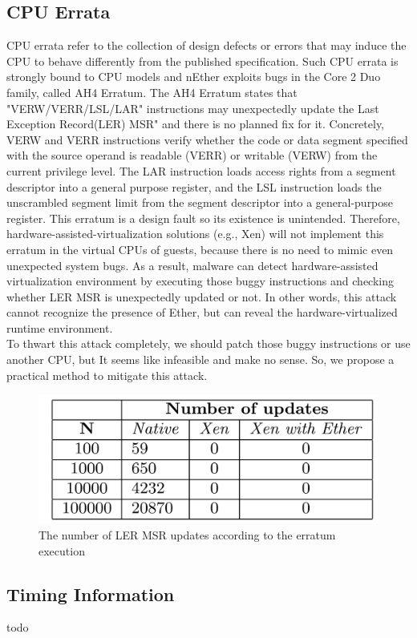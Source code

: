 \subsection{CPU Errata}
\label{sec:approach-errata}
CPU errata refer to the collection of design defects or errors that may induce the CPU to behave differently from the published specification. Such CPU errata is strongly bound to CPU models and nEther exploits bugs in the Core 2 Duo family, called AH4 Erratum. The AH4 Erratum states that "VERW/VERR/LSL/LAR" instructions may unexpectedly update the Last Exception Record(LER) MSR" and there is no planned fix for it. Concretely, VERW and VERR instructions verify whether the code or data segment specified with the source operand is readable (VERR) or writable (VERW) from the current privilege level. The LAR instruction loads access rights from a segment descriptor into a general purpose register, and the LSL instruction loads the unscrambled segment limit from the segment descriptor into a general-purpose register. This erratum is a design fault so its existence is unintended. Therefore, hardware-assisted-virtualization solutions (e.g., Xen) will not implement this erratum in the virtual CPUs of guests, because there is no need to mimic even unexpected system bugs. As a result, malware can detect hardware-assisted virtualization environment by executing those buggy instructions and checking whether LER MSR is unexpectedly updated or not. In other words, this attack cannot recognize the presence of Ether, but can reveal the hardware-virtualized runtime environment. \\

To thwart this attack completely, we should patch those buggy instructions or use another CPU, but It seems like infeasible and make no sense. So, we propose a practical method to mitigate this attack.

\begin{figure}[!h]
	\centering
	\includegraphics[width=\linewidth]{figure/errata_table.png}
	\caption{The number of LER MSR updates according to the erratum execution}
	\label{fig:errata}
\end{figure}


\subsection{Timing Information}
\label{sec:approach-timing}

todo



